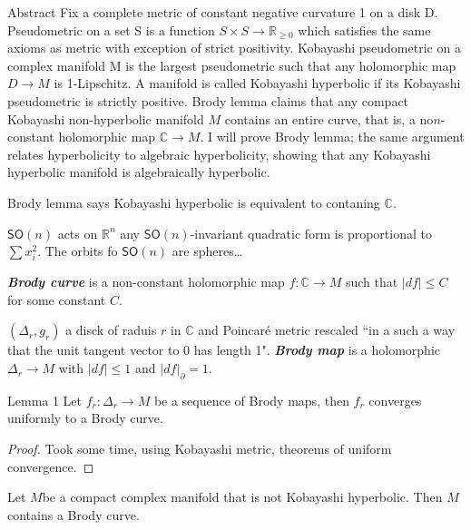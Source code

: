 \begin{thing6}{Abstract}
Fix a complete metric of constant negative curvature 1 on a disk D. Pseudometric on a set S is a function $S \times S \to \mathbb{R}_{\geq 0}$ which satisfies the same axioms as metric with exception of strict positivity. Kobayashi pseudometric on a complex manifold M is the largest pseudometric such that any holomorphic map \(D \to M\) is 1-Lipschitz. A manifold is called Kobayashi hyperbolic if its Kobayashi pseudometric is strictly positive. Brody lemma claims that any compact Kobayashi non-hyperbolic manifold \(M\) contains an entire curve, that is, a no\(n\)-constant holomorphic map \(\mathbb{C} \to M\). I will prove Brody lemma; the same argument relates hyperbolicity to algebraic hyperbolicity, showing that any Kobayashi hyperbolic manifold is algebraically hyperbolic.
\end{thing6}
\vspace{2em}
\begin{upshot}\leavevmode
	Brody lemma says Kobayashi hyperbolic is equivalent to contaning $\mathbb{C}$.
\end{upshot}
$\mathsf{SO}(n)$ acts on $\mathbb{R}^n$ any $\mathsf{SO}(n)$-invariant quadratic form is proportional to $\sum x_i^2$. The orbits fo $\mathsf{SO}(n)$ are spheres…

\begin{defn}\leavevmode
	\textit{\textbf{Brody curve}} is a non-constant holomorphic map $f:\mathbb{C}\to M$ such that $|df|\leq C$ for some constant $C$.
\end{defn}

\begin{defn}\leavevmode
	$(\Delta_r,g_r)$ a disck of raduis $r$ in $\mathbb{C}$ and Poincaré metric rescaled ``in a such a way that the unit tangent vector to 0 has length 1". \textit{\textbf{Brody map}} is a holomorphic $\Delta_r \to M$ with $|df|\leq 1$ and $|df|_\partial=1$.
\end{defn}

\begin{thing4}{Lemma 1}\leavevmode
Let $f_r:\Delta_r \to M$ be a sequence of Brody maps, then $f_r$ converges uniformly to a Brody curve.
\end{thing4}

\begin{proof}\leavevmode
Took some time, using Kobayashi metric, theorems of uniform convergence.
\end{proof}

\begin{thm}\leavevmode
	Let $M$be a compact complex manifold that is not Kobayashi hyperbolic. Then $M$ contains a Brody curve.
\end{thm}

